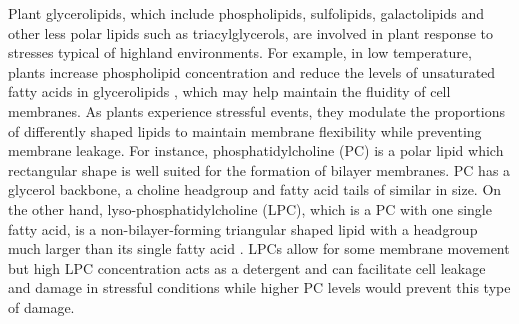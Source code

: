 \documentclass[9pt,twocolumn,twoside,lineno]{BioRxiv}
\begin{document}

Plant glycerolipids, which include phospholipids, sulfolipids, galactolipids and other less polar lipids such as triacylglycerols, are involved in plant response to stresses typical of highland environments.
For example, in low temperature, plants increase phospholipid concentration \cite{Degenkolbe2012-wf} and reduce the levels of unsaturated fatty acids in glycerolipids \cite{Welti2002-uk, Lynch1987-ln}, which may help maintain the fluidity of cell membranes.
As plants experience stressful events, they modulate the proportions of differently shaped lipids to maintain membrane flexibility while preventing membrane leakage. For instance, phosphatidylcholine (PC) is a polar lipid which rectangular shape is well suited for the formation of bilayer membranes. PC has a glycerol backbone, a choline headgroup and fatty acid tails of similar in size.
On the other hand, lyso-phosphatidylcholine (LPC), which is a PC with one single fatty acid, is a non-bilayer-forming triangular shaped lipid with a headgroup much larger than its single fatty acid \cite{Jouhet2013-fv}.
LPCs allow for some membrane movement but high LPC concentration acts as a detergent and can facilitate cell leakage and damage in stressful conditions while higher PC levels would prevent this type of damage.
\end{document}
